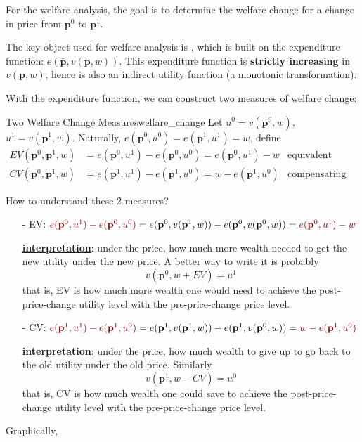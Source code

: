 For the welfare analysis, the goal is to determine the welfare change for a change in price from $\mathbf{p}^0$ to $\mathbf{p}^1$.

The key object used for welfare analysis is , which is built on the expenditure function: $e(\bar{\mathbf{p}},v(\mathbf{p},w))$. This expenditure function is \textbf{strictly increasing} in $v(\mathbf{p},w)$, hence is also an indirect utility function (a monotonic transformation).

With the expenditure function, we can construct two measures of welfare change:
\begin{definition}{Two Welfare Change Measures}{welfare_change}
    Let $u^0 = v(\mathbf{p}^0,w)$, $u^1 = v(\mathbf{p}^1,w)$. Naturally, $e(\mathbf{p}^0,u^0)=e(\mathbf{p}^1,u^1)=w$, define
    \begin{align*}
        EV(\mathbf{p}^0,\mathbf{p}^1,w) &=e(\mathbf{p}^0,u^1)-e(\mathbf{p}^0,u^0)=e(\mathbf{p}^0,u^1)-w & \text{equivalent variation}\\
        CV(\mathbf{p}^0,\mathbf{p}^1,w) &=e(\mathbf{p}^1,u^1)-e(\mathbf{p}^1,u^0)=w-e(\mathbf{p}^1,u^0) & \text{compensating variation}
    \end{align*}
\end{definition}

How to understand these 2 measures?

\begin{itemize}
    \item[-] EV: ${\color{red!55!black}e(\mathbf{p}^0,u^1)-e(\mathbf{p}^0,u^0)} = e(\mathbf{p}^0,v(\mathbf{p}^1,w))-e(\mathbf{p}^0,v(\mathbf{p}^0,w)) = {\color{red!55!black}e(\mathbf{p}^0,u^1)-w}$
    
    \underline{\textbf{interpretation}}: under the  price, how much more wealth needed to get the new utility under the new price. A better way to write it is probably
    $$
    v \left(\mathbf{p}^0, w+EV \right)=u^1
    $$
    that is, EV is how much more wealth one would need to achieve the post-price-change utility level with the pre-price-change price level.
    
    \item[-] CV: ${\color{red!55!black}e(\mathbf{p}^1,u^1)-e(\mathbf{p}^1,u^0)} = e(\mathbf{p}^1,v(\mathbf{p}^1,w))-e(\mathbf{p}^1,v(\mathbf{p}^0,w)) = {\color{red!55!black}w- e(\mathbf{p}^1,u^0)}$
    
    \underline{\textbf{interpretation}}: under the  price, how much wealth to give up to go back to the old utility under the old price. Similarly
    $$
    v \left(\mathbf{p}^1, w-CV \right)=u^0
    $$
    that is, CV is how much wealth one could save to achieve the post-price-change utility level with the pre-price-change price level.
\end{itemize}

Graphically,